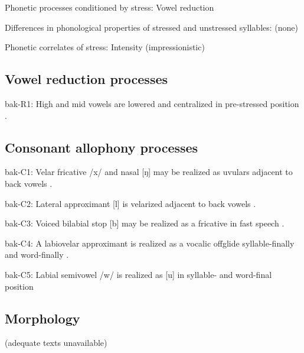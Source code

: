 {\begin{appendixdesc}
\item[Phonetic processes conditioned by stress:] Vowel reduction

\item[Differences in phonological properties of stressed and unstressed syllables:] (none)

\item[Phonetic correlates of stress:] Intensity (impressionistic)
\end{appendixdesc}
\subsection*{Vowel reduction processes}
\begin{appendixdesc}

\item[bak-R1:] High and mid vowels are lowered and centralized in pre-stressed position \citep{BerksonEtAl2016}.
\end{appendixdesc}
\subsection*{Consonant allophony processes}
\begin{appendixdesc}

\item[bak-C1:] Velar fricative /x/ and nasal [ŋ] may be realized as uvulars adjacent to back vowels \citep[11]{Poppe1964}.

\item[bak-C2:] Lateral approximant [l] is velarized adjacent to back vowels \citep[10]{Poppe1964}.

\item[bak-C3:] Voiced bilabial stop [b] may be realized as a fricative in fast speech \citep[8]{Poppe1964}.

\item[bak-C4:]  A labiovelar approximant is realized as a vocalic offglide syllable-finally and word-finally \citep[9]{Poppe1964}.

\item[bak-C5:] Labial semivowel /w/ is realized as [u] in syllable- and word-final position \citep[9]{Poppe1964}
\end{appendixdesc}

\subsection*{Morphology}

(adequate texts unavailable)

}
